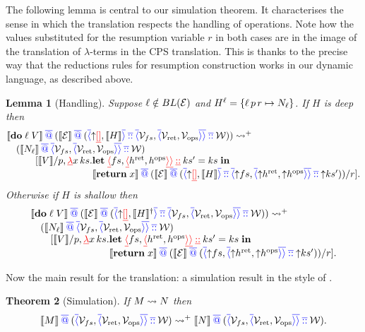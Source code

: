 \documentclass[12pt,phd,lfcs,twoside,openright,logo,leftchapter,normalheadings]{infthesis}
\theoremstyle{plain}
\newtheorem{theorem}{Theorem}[chapter]
\newtheorem{lemma}[theorem]{Lemma}
\theoremstyle{definition}
\begin{document}
The following lemma is central to our simulation theorem. It
characterises the sense in which the translation respects the handling
of operations.  Note how the values substituted for the resumption
variable $r$ in both cases are in the image of the translation of
$\lambda$-terms in the CPS translation. This is thanks to the precise
way that the reductions rules for resumption construction works in our
dynamic language, as described above.
%
\begin{lemma}[Handling]\label{lem:handle-op-gen-cont}
Suppose $\ell \notin BL(\mathcal{E})$ and $H^{\ell} = \{\ell\,p\,r \mapsto N_\ell\}$. If $H$ is deep then
  \[
    \bl
    \cps{\Do\;\ell\;V} \sapp (\cps{\EC} \sapp (\sRecord{\snil, \cps{H}} \scons \sRecord{\sV_{fs},\sRecord{\sV_{\mret},\sV_{\mops}}} \scons \sW)) \reducesto^+ \\
    \quad (\cps{N_\ell} \sapp \sRecord{\sV_{fs},\sRecord{\sV_{\mret},\sV_{\mops}}} \scons \sW)\\
    \qquad \quad [\cps{V}/p,
    \dlam x\,\dhk.\bl
    \Let\;\dRecord{fs, \dRecord{\vhret, \vhops}} \dcons \dhk' = \dhk\;\In\;\\
    \cps{\Return\;x} \sapp (\cps{\EC} \sapp (\sRecord{\snil, \cps{H}} \scons \sRecord{\reflect \dlk, \sRecord{\reflect \vhret, \reflect \vhops}} \scons \reflect\dhk'))/r]. \\
    \el\\
    \el
  \]
  Otherwise if $H$ is shallow then
  \[
   \bl
    \cps{\Do\;\ell\;V} \sapp (\cps{\EC} \sapp (\sRecord{\snil, \cps{H}^\dagger} \scons \sRecord{\sV_{fs},\sRecord{\sV_{\mret},\sV_{\mops}}} \scons \sW)) \reducesto^+ \\
    \quad (\cps{N_\ell} \sapp \sRecord{\sV_{fs},\sRecord{\sV_{\mret},\sV_{\mops}}} \scons \sW)\\
    \qquad [\cps{V}/p, \dlam x\,\dhk.  \bl
    \Let\;\dRecord{\dlk, \dRecord{\vhret, \vhops}} \dcons \dhk' = \dhk \;\In \\
    \cps{\Return\;x} \sapp (\cps{\EC} \sapp (\sRecord{\reflect \dlk, \sRecord{\reflect \vhret, \reflect \vhops}} \scons \reflect\dhk'))/r]. \\
    \el \\
    \el
  \]
\end{lemma}

\medskip

Now the main result for the translation: a simulation result in the
style of \citet{Plotkin75}.
%
\begin{theorem}[Simulation]
  \label{thm:ho-simulation-gen-cont}
  If $M \leadsto N$ then
  \[
  \llbracket M \rrbracket \mathbin{{\color{blue}\overline{@}}} ({\color{blue}\overline{\langle}}\mathcal{V}_{fs}, {\color{blue}\overline{\langle}}\mathcal{V}_{\mathrm{ret}},\mathcal{V}_{\mathrm{ops}}{\color{blue}\overline{\rangle}}{\color{blue}\overline{\rangle}}
  \mathbin{{\color{blue}\overline{::}}} \mathcal{W}) \leadsto^+ \llbracket N \rrbracket \mathbin{{\color{blue}\overline{@}}} ({\color{blue}\overline{\langle}}\mathcal{V}_{fs},
    {\color{blue}\overline{\langle}}\mathcal{V}_{\mathrm{ret}},\mathcal{V}_{\mathrm{ops}}{\color{blue}\overline{\rangle}}{\color{blue}\overline{\rangle}} \mathbin{{\color{blue}\overline{::}}} \mathcal{W}).
  \]
\end{theorem}
\end{document}
